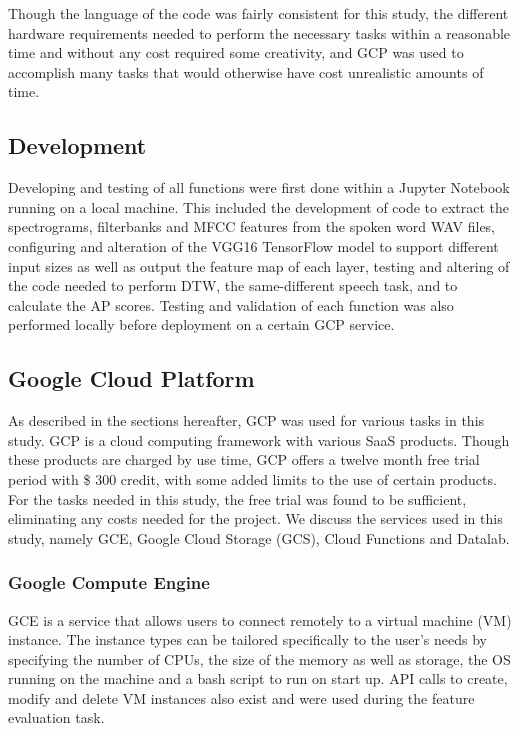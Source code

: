 Though the language of the code was fairly consistent for this study, the different hardware requirements needed to perform the necessary tasks within a reasonable time and without any cost required some creativity, and GCP was used to accomplish many tasks that would otherwise have cost unrealistic amounts of time.

\subsection{Development}

Developing and testing of all functions were first done within a Jupyter Notebook running on a local machine.
This included the development of code to extract the spectrograms, filterbanks and MFCC features from the spoken word WAV files, configuring and alteration of the VGG16 TensorFlow model to support different input sizes as well as output the feature map of each layer, testing and altering of the code needed to perform DTW, the same-different speech task, and to calculate the AP scores.
Testing and validation of each function was also performed locally before deployment on a certain GCP service.

\subsection{Google Cloud Platform}

As described in the sections hereafter, GCP was used for various tasks in this study.
GCP is a cloud computing framework with various SaaS products.
Though these products are charged by use time, GCP offers a twelve month free trial period with \$ 300 credit, with some added limits to the use of certain products.
For the tasks needed in this study, the free trial was found to be sufficient, eliminating any costs needed for the project.
We discuss the services used in this study, namely GCE, Google Cloud Storage (GCS), Cloud Functions and Datalab.

\subsubsection{Google Compute Engine}

GCE is a service that allows users to connect remotely to a virtual machine (VM) instance.
The instance types can be tailored specifically to the user's needs by specifying the number of CPUs, the size of the memory as well as storage, the OS running on the machine and a bash script to run on start up.
API calls to create, modify and delete VM instances also exist and were used during the feature evaluation task. 

